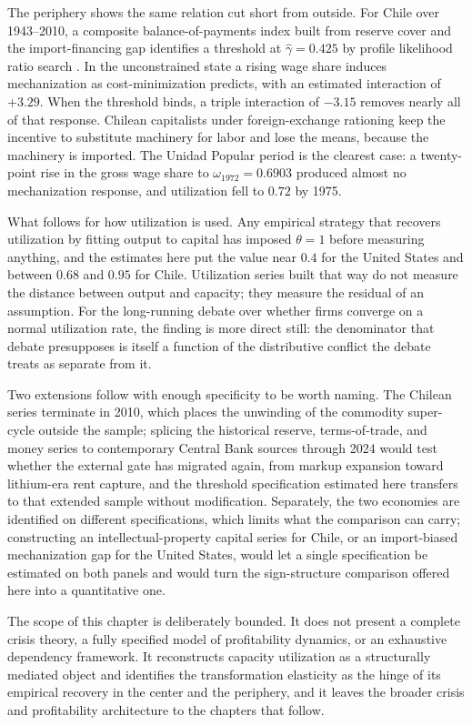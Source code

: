 The periphery shows the same relation cut short from outside. For Chile
over 1943--2010, a composite balance-of-payments index built from reserve
cover and the import-financing gap identifies a threshold at
$\hat{\gamma} = 0.425$ by profile likelihood ratio search
\citep{Hansen2000}. In the unconstrained state a rising wage share
induces mechanization as cost-minimization predicts, with an estimated
interaction of $+3.29$. When the threshold binds, a triple interaction of
$-3.15$ removes nearly all of that response. Chilean capitalists under
foreign-exchange rationing keep the incentive to substitute machinery for
labor and lose the means, because the machinery is imported. The Unidad
Popular period is the clearest case: a twenty-point rise in the gross
wage share to $\omega_{1972} = 0.6903$ produced almost no mechanization
response, and utilization fell to $0.72$ by 1975.

What follows for how utilization is used. Any empirical strategy that
recovers utilization by fitting output to capital has imposed
$\theta = 1$ before measuring anything, and the estimates here put the
value near $0.4$ for the United States and between $0.68$ and $0.95$ for
Chile. Utilization series built that way do not measure the distance
between output and capacity; they measure the residual of an assumption.
For the long-running debate over whether firms converge on a normal
utilization rate, the finding is more direct still: the denominator that
debate presupposes is itself a function of the distributive conflict the
debate treats as separate from it.

Two extensions follow with enough specificity to be worth naming. The
Chilean series terminate in 2010, which places the unwinding of the
commodity super-cycle outside the sample; splicing the historical
reserve, terms-of-trade, and money series to contemporary Central Bank
sources through 2024 would test whether the external gate has migrated
again, from markup expansion toward lithium-era rent capture, and the
threshold specification estimated here transfers to that extended sample
without modification. Separately, the two economies are identified on
different specifications, which limits what the comparison can carry;
constructing an intellectual-property capital series for Chile, or an
import-biased mechanization gap for the United States, would let a single
specification be estimated on both panels and would turn the
sign-structure comparison offered here into a quantitative one.

The scope of this chapter is deliberately bounded. It does not present a
complete crisis theory, a fully specified model of profitability
dynamics, or an exhaustive dependency framework. It reconstructs capacity
utilization as a structurally mediated object and identifies the
transformation elasticity as the hinge of its empirical recovery in the
center and the periphery, and it leaves the broader crisis and
profitability architecture to the chapters that follow.
